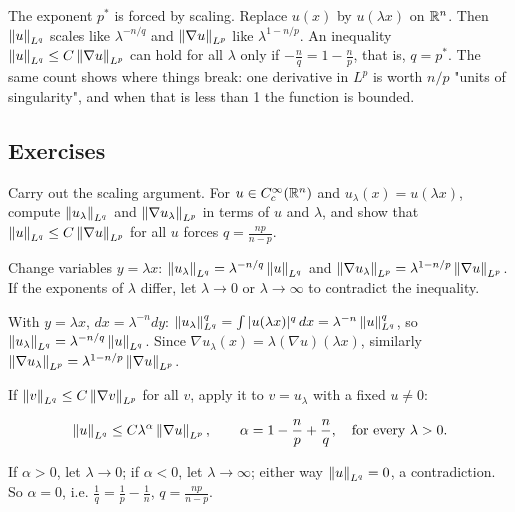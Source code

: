 The exponent $p^*$ is forced by scaling. Replace $u(x)$ by $u(\lambda x)$ on $\mathbb{R}^n$. Then $\left\lVert u\right\rVert_{L^q}$ scales like $\lambda^{-n/q}$ and $\left\lVert \nabla u\right\rVert_{L^p}$ like $\lambda^{1-n/p}$. An inequality $\left\lVert u\right\rVert_{L^q}\le C\left\lVert \nabla u\right\rVert_{L^p}$ can hold for all $\lambda$ only if $-\frac nq = 1 - \frac np$, that is, $q = p^*$. The same count shows where things break: one derivative in $L^p$ is worth $n/p$ "units of singularity", and when that is less than 1 the function is bounded.

\subsection*{Exercises}

\begin{exercise}
  Carry out the scaling argument. For $u \in C_c^\infty(\mathbb{R}^n)$ and $u_\lambda(x) = u(\lambda x)$, compute $\left\lVert u_\lambda\right\rVert_{L^q}$ and $\left\lVert \nabla u_\lambda\right\rVert_{L^p}$ in terms of $u$ and $\lambda$, and show that $\left\lVert u\right\rVert_{L^q} \le C\left\lVert \nabla u\right\rVert_{L^p}$ for all $u$ forces $q = \frac{np}{n-p}$.
  \begin{hint}
    Change variables $y = \lambda x$: $\left\lVert u_\lambda\right\rVert_{L^q} = \lambda^{-n/q}\left\lVert u\right\rVert_{L^q}$ and $\left\lVert \nabla u_\lambda\right\rVert_{L^p} = \lambda^{1-n/p}\left\lVert \nabla u\right\rVert_{L^p}$. If the exponents of $\lambda$ differ, let $\lambda \to 0$ or $\lambda \to \infty$ to contradict the inequality.
  \end{hint}
  \begin{solution}
    With $y = \lambda x$, $dx = \lambda^{-n}dy$: $\left\lVert u_\lambda\right\rVert_{L^q}^q = \int|u(\lambda x)|^q\,dx = \lambda^{-n}\left\lVert u\right\rVert_{L^q}^q$, so $\left\lVert u_\lambda\right\rVert_{L^q} = \lambda^{-n/q}\left\lVert u\right\rVert_{L^q}$. Since $\nabla u_\lambda(x) = \lambda(\nabla u)(\lambda x)$, similarly $\left\lVert \nabla u_\lambda\right\rVert_{L^p} = \lambda^{1-n/p}\left\lVert \nabla u\right\rVert_{L^p}$.

    If $\left\lVert v\right\rVert_{L^q} \le C\left\lVert \nabla v\right\rVert_{L^p}$ for all $v$, apply it to $v = u_\lambda$ with a fixed $u \ne 0$:

    \[ \left\lVert u\right\rVert_{L^q} \le C\lambda^{\alpha}\left\lVert \nabla u\right\rVert_{L^p}, \qquad \alpha = 1 - \frac np + \frac nq, \quad\text{for every }\lambda > 0. \]

    If $\alpha > 0$, let $\lambda \to 0$; if $\alpha < 0$, let $\lambda \to \infty$; either way $\left\lVert u\right\rVert_{L^q} = 0$, a contradiction. So $\alpha = 0$, i.e. $\frac1q = \frac1p - \frac1n$, $q = \frac{np}{n-p}$.
  \end{solution}
\end{exercise}

